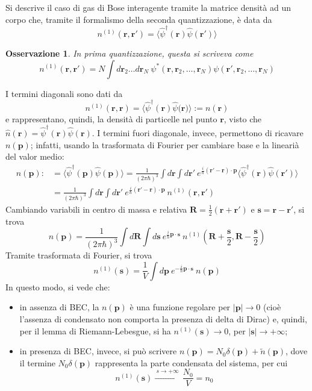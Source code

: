 \documentclass[11pt, a4paper]{scrartcl}
\theoremstyle{style}
\newtheorem{osservazione}{Osservazione}[section]
\theoremstyle{style1}
\numberwithin{equation}{subsection}
\begin{document}
Si descrive il caso di gas di Bose interagente tramite la matrice densit\`a ad un corpo che, tramite il formalismo della seconda quantizzazione, \`e data da
\[
n^{(1)} (\mathbf{r} ,\mathbf{r} ') = \langle \hat{\psi }^\dagger (\mathbf{r} ) \hat{\psi }(\mathbf{r} ') \rangle
\] 
\begin{osservazione}
In prima quantizzazione, questa si scriveva come
\[
n^{(1)} (\mathbf{r} ,\mathbf{r} ') = N \int d\mathbf{r} _2 \ldots d\mathbf{r} _N \ \psi ^* (\mathbf{r} , \mathbf{r} _2,\ldots,\mathbf{r} _N) \psi (\mathbf{r} ' , \mathbf{r} _2,\ldots,\mathbf{r} _N)
\] 
\end{osservazione}
\noindent I termini diagonali sono dati da 
\[
n^{(1)} (\mathbf{r} ,\mathbf{r} )  = \langle \hat{\psi }^\dagger (\mathbf{r}) \hat{\psi }(\mathbf{r)}  \rangle := n(\mathbf{r} )
\] 
e rappresentano, quindi, la densit\`a di particelle nel punto $\mathbf{r} $, visto che $\hat{n}(\mathbf{r} ) = \hat{\psi }^\dagger (\mathbf{r} ) \hat{\psi }(\mathbf{r} )$.
I termini fuori diagonale, invece, permettono di ricavare $n(\mathbf{p} )$; infatti, usando la trasformata di Fourier per cambiare base e la lineari\`a del valor medio:
\[
	\begin{split}
		n(\mathbf{p} ) :&= \langle \hat{\psi }^\dagger (\mathbf{p} )\hat{\psi }(\mathbf{p})  \rangle = \frac{1}{(2\pi \hbar )^3} \int d\mathbf{r} \int d\mathbf{r} ' \ e^{\frac{i}{\hbar }(\mathbf{r}' -\mathbf{r}) \cdot \mathbf{p} } \langle \hat{\psi }^\dagger (\mathbf{r} ) \hat{\psi }(\mathbf{r}' ) \rangle\\
				&= \frac{1}{(2\pi\hbar )^3} \int d\mathbf{r} \int d\mathbf{r} ' \ e^{\frac{i}{\hbar }(\mathbf{r} ' - \mathbf{r} ) \cdot \mathbf{p} }\ n^{(1)}(\mathbf{r} ,\mathbf{r} ')
	\end{split}
\] 
Cambiando variabili in centro di massa e relativa $\mathbf{R}  = \frac{1}{2}(\mathbf{r} +\mathbf{r} ')$ e $\mathbf{s} = \mathbf{r} -\mathbf{r} '$, si trova 
\[
n(\mathbf{p} ) = \frac{1}{(2\pi\hbar )^3} \int d\mathbf{R}  \int d\mathbf{s}  \ e^{\frac{i}{\hbar } \mathbf{p} \cdot \mathbf{s} }\ n^{(1)}\left(\mathbf{R} +\frac{\mathbf{s} }{2}, \mathbf{R} -\frac{\mathbf{s} }{2}\right) 
\] 
Tramite trasformata di Fourier, si trova
\[
n^{(1)}(\mathbf{s} ) = \frac{1}{V}\int d\mathbf{p} \ e^{-\frac{i}{\hbar }\mathbf{p} \cdot \mathbf{s} }\ n(\mathbf{p} )
\] 
In questo modo, si vede che:
\begin{itemize}
	\item in assenza di BEC, la $n(\mathbf{p} )$ \`e una funzione regolare per $\lvert \mathbf{p} \rvert  \to 0$ (cio\`e l'assenza di condensato non comporta la presenza di delta di Dirac) e, quindi, per il lemma di Riemann-Lebesgue, si ha $n^{(1)}(\mathbf{s} ) \to 0$, per $\lvert \mathbf{s}  \rvert \to +\infty$;
	\item in presenza di BEC, invece, si pu\`o scrivere $n(\mathbf{p} ) = N_0 \delta (\mathbf{p} ) + \tilde{n}(\mathbf{p} )$, dove il termine $N_0 \delta (\mathbf{p} )$ rappresenta la parte condensata del sistema, per cui 
		\[
			n^{(1)}(\mathbf{s} ) \xrightarrow{\ s\to +\infty \ } \frac{N_0}{V}=n_0
		\] 
\end{itemize}
\end{document}
